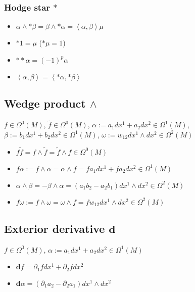 \documentclass{scrartcl}
\newcommand{\exd}{\mathbf{d}}
\begin{document}
      \subsubsection{Hodge star \( * \)}
        \begin{itemize}
          \item \( \alpha \wedge *\beta = \beta \wedge *\alpha = \left\langle \alpha,\beta \right\rangle\mu \)
          \item \( *1 = \mu \) \quad(\( *\mu = 1 \))
          \item \( **\alpha = (-1)^{p}\alpha \)
          \item \( \left\langle \alpha, \beta \right\rangle =  \left\langle *\alpha, *\beta \right\rangle\)
        \end{itemize}

    \subsection{Wedge product \( \wedge \)}
      \( f\in \Omega^{0}(M)\),
      \( \tilde{f}\in \Omega^{0}(M) \),
      \( \alpha:= a_{1}dx^{1} + a_{2}dx^{2} \in \Omega^{1}(M) \),
      \( \beta:= b_{1}dx^{1} + b_{2}dx^{2} \in \Omega^{1}(M) \),
      \( \omega:= w_{12}dx^{1}\wedge dx^{2} \in \Omega^{2}(M) \)
      \begin{itemize}
        \item \( f\tilde{f}= f\wedge\tilde{f} = \tilde{f}\wedge f \in \Omega^{0}(M) \)
        \item \( f\alpha := f\wedge\alpha = \alpha\wedge f =  fa_{1}dx^{1} + fa_{2}dx^{2} \in \Omega^{1}(M)\)
        \item \( \alpha\wedge\beta = - \beta\wedge\alpha = \left( a_{1}b_{2} - a_{2}b_{1} \right) dx^{1}\wedge dx^{2} \in \Omega^{2}(M) \)
        \item \( f\omega := f\wedge\omega = \omega\wedge f = fw_{12}dx^{1}\wedge dx^{2} \in \Omega^{2}(M) \)
      \end{itemize}
      
    \subsection{Exterior derivative \( \exd \)}
      \( f\in \Omega^{0}(M)\), 
      \( \alpha:= a_{1}dx^{1} + a_{2}dx^{2} \in \Omega^{1}(M) \)
      \begin{itemize}
        \item \( \exd f = \partial_{1}fdx^{1} + \partial_{2}fdx^{2} \)
        \item \( \exd\alpha = \left( \partial_{1}a_{2} - \partial_{2}a_{1} \right) dx^{1}\wedge dx^{2}\)
      \end{itemize}
\end{document}
